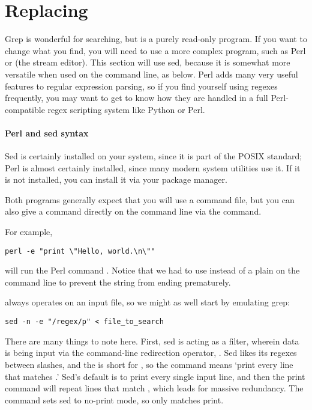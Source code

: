 \section{Replacing}

Grep is wonderful for searching, but is a purely read-only program. If
you want to change what you find, you will need to use a more complex
program, such as Perl or  (the stream editor). This section
will use sed, because it is somewhat more versatile when used on the
command line, as below. Perl adds many very useful features to regular
expression parsing, so if you find yourself using regexes frequently,
you may want to get to know how they are handled in a full
Perl-compatible regex scripting system like Python or Perl.

\paragraph{Perl and sed syntax} 
Sed is certainly installed on your system, since it is part of the
POSIX standard; Perl is almost certainly installed, since many modern
system utilities use it. If it is not installed, you can install it via
your package manager.

Both programs generally expect that you will use a command file, but you
can also give a command directly on the command line via the 
command.

For example,
\begin{lstlisting}
perl -e "print \"Hello, world.\n\""
\end{lstlisting}
will run the Perl command . Notice
that we had to use  instead of a plain  on the
command line to prevent the string from ending prematurely.

 always operates on an input file, so we might as well start by 
emulating grep:\label{sedintro}
\begin{lstlisting}
sed -n -e "/regex/p" < file_to_search
\end{lstlisting}
There are many things to note here. First, sed is acting as a filter,
wherein data is being input via the command-line redirection operator,
\ci{<}. Sed likes its regexes between
slashes, and the  is short for , so the command
 means `print every line that matches .'
Sed's default is to print every single input line, and then the print
command will repeat lines that match , which leads for massive
redundancy. The  command sets sed to no-print mode, so only
matches print.

